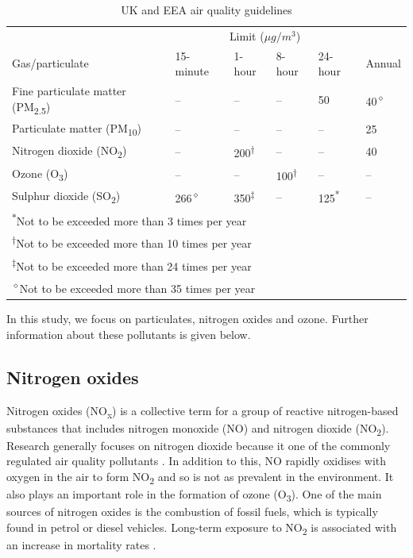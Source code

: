 \documentclass[11pt]{report}
\begin{document}
\begin{table}[!tbp]
  \centering
  \caption{UK and EEA air quality guidelines}
  \label{airqualityguidelines}
  \begin{tabular}{ l l l l l l }
  \toprule
  & \multicolumn{4}{c}{Limit ($\mu g/m^3$)} 													\\ \cmidrule(l{0mm}r{0mm}){2-6}
  Gas/particulate  							& 15-minute 	& 1-hour 	& 8-hour 	& 24-hour 	& Annual 	\\ \midrule
  Fine particulate matter (PM\textsubscript{2.5}) 	& -- 			& -- 		& -- 		& 50 		& 40\textsuperscript{$\diamond$} 		\\
  Particulate matter (PM\textsubscript{10}) 		& -- 			& -- 		& -- 		& -- 		& 25 		\\
  Nitrogen dioxide (NO\textsubscript{2}) 			& -- 			& 200\textsuperscript{$\dagger$} 	& -- 		& -- 		& 40 		\\
  Ozone (O\textsubscript{3}) 					& -- 			& -- 		& 100\textsuperscript{$\dagger$}	& --		& -- 		\\
  Sulphur dioxide (SO\textsubscript{2})			& 266\textsuperscript{$\diamond$}		& 350\textsuperscript{$\ddagger$}	& --		& 125\textsuperscript{*}	& -- 		\\ \bottomrule
  \multicolumn{6}{l}{\textsuperscript{$\ast$}\footnotesize{Not to be exceeded more than 3 times per year}} \\
  \multicolumn{6}{l}{\textsuperscript{$\dagger$}\footnotesize{Not to be exceeded more than 10 times per year}} \\
  \multicolumn{6}{l}{\textsuperscript{$\ddagger$}\footnotesize{Not to be exceeded more than 24 times per year}} \\
  \multicolumn{6}{l}{\textsuperscript{$\diamond$}\footnotesize{Not to be exceeded more than 35 times per year}} \\
  \end{tabular}
\end{table}


In this study, we focus on particulates, nitrogen oxides and ozone. Further information about these pollutants is given below.

\subsection{Nitrogen oxides}

Nitrogen oxides (NO\textsubscript{x}) is a collective term for a group of reactive nitrogen-based substances that includes nitrogen monoxide (NO) and nitrogen dioxide (NO\textsubscript{2}). Research generally focuses on nitrogen dioxide because it one of the commonly regulated air quality pollutants \citep{Brook2004cardiostmnt}. In addition to this, NO rapidly oxidises with oxygen in the air to form NO\textsubscript{2} and so is not as prevalent in the environment. It also plays an important role in the formation of ozone (O\textsubscript{3}). One of the main sources of nitrogen oxides is the combustion of fossil fuels, which is typically found in petrol or diesel vehicles. Long-term exposure to NO\textsubscript{2} is associated with an increase in mortality rates \citep{Faustini2014nitrogenmortality}.
\end{document}
